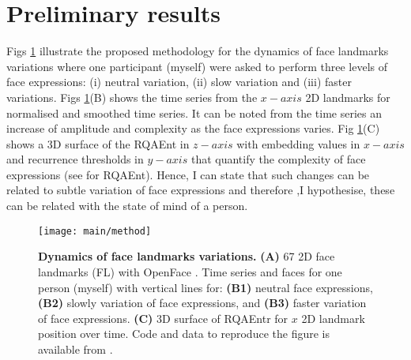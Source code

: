 \documentclass[12pt]{article}
\begin{document}
\section{Preliminary results}
Figs \ref{fig:method} illustrate the proposed methodology 
for the dynamics of face landmarks variations 
where one participant (myself) were asked to perform three levels of 
face expressions:
(i) neutral variation, (ii) slow variation and (iii) faster variations.
Figs \ref{fig:method}(B) shows the time series from the $x-axis$ 
2D landmarks for normalised and smoothed time series.
It can be noted from the time series an increase of amplitude 
and complexity as the face expressions varies. 
Fig \ref{fig:method}(C) shows a 3D surface of the RQAEnt 
in $z-axis$ with embedding values in $x-axis$ and 
recurrence thresholds in $y-axis$ 
that quantify the complexity of face expressions 
(see \cite{2018arXiv181009249X} for RQAEnt).
Hence, I can state that 
such changes can be related to subtle variation of face expressions
and therefore ,I hypothesise, these can be related with the 
state of mind of a person. 


\begin{figure}
\centering
\texttt{[image: main/method]}
    \caption{
	{\bf Dynamics of face landmarks variations.}
	{\bf(A)} 67 2D face landmarks (FL) with OpenFace \cite{baltrusaitis2018}.
	Time series and faces for one person (myself) with vertical lines for: 
	{\bf(B1)} neutral face expressions,
	{\bf(B2)} slowly variation of face expressions, and
	{\bf(B3)} faster variation of face expressions.   
	{\bf(C)} 3D surface of RQAEntr for $x$ 2D landmark position over time.
	Code and data to reproduce the figure is available from \cite{xochicale2018repo}.
        }
\label{fig:method}
\end{figure}




\end{document}
